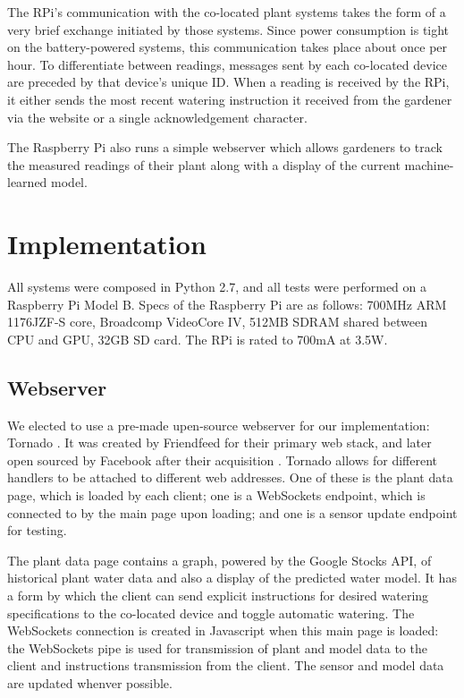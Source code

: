 \documentclass[a4paper]{article}
\begin{document}
The RPi's communication with the co-located plant systems takes the form of a very brief exchange initiated by those systems.  Since power consumption is tight on the battery-powered systems, this communication takes place about once per hour.  To differentiate between readings, messages sent by each co-located device are preceded by that device's unique ID.  When a reading is received by the RPi, it either sends the most recent watering instruction it received from the gardener via the website or a single acknowledgement character.

The Raspberry Pi also runs a simple webserver which allows gardeners to track the measured readings of their plant along with a display of the current machine-learned model.

\section{Implementation}

All systems were composed in Python 2.7, and all tests were performed on a Raspberry Pi Model B.  Specs of the Raspberry Pi are as follows: 700MHz ARM 1176JZF-S core, Broadcomp VideoCore IV, 512MB SDRAM shared between CPU and GPU, 32GB SD card.  The RPi is rated to 700mA at 3.5W.

\subsection{Webserver}

We elected to use a pre-made upen-source webserver for our implementation: Tornado \cite{}.  It was created by Friendfeed for their primary web stack, and later open sourced by Facebook after their acquisition \cite{}.  Tornado allows for different handlers to be attached to different web addresses.  One of these is the plant data page, which is loaded by each client; one is a WebSockets endpoint, which is connected to by the main page upon loading; and one is a sensor update endpoint for testing.

The plant data page contains a graph, powered by the Google Stocks API, of historical plant water data and also a display of the predicted water model.  It has a form by which the client can send explicit instructions for desired watering specifications to the co-located device and toggle automatic watering.  The WebSockets connection is created in Javascript when this main page is loaded: the WebSockets pipe is used for transmission of plant and model data to the client and instructions transmission from the client.  The sensor and model data are updated whenver possible.
\end{document}
